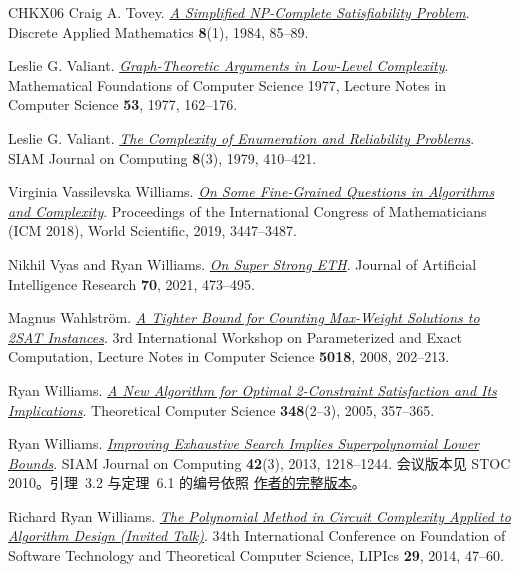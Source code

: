 \documentclass[11pt,reqno]{amsart}
\numberwithin{equation}{section}
\theoremstyle{definition}\newtheorem{definition}[theorem]{定义}
\theoremstyle{remark}\newtheorem{remark}[theorem]{注}
\begin{document}
\begin{thebibliography}{CHKX06}
Craig A. Tovey.
\href{https://doi.org/10.1016/0166-218X(84)90081-7}
{\emph{A Simplified NP-Complete Satisfiability Problem}}.
Discrete Applied Mathematics \textbf{8}(1), 1984, 85--89.

Leslie G. Valiant.
\href{https://doi.org/10.1007/3-540-08353-7_135}
{\emph{Graph-Theoretic Arguments in Low-Level Complexity}}.
Mathematical Foundations of Computer Science 1977,
Lecture Notes in Computer Science \textbf{53}, 1977, 162--176.

Leslie G. Valiant.
\href{https://doi.org/10.1137/0208032}
{\emph{The Complexity of Enumeration and Reliability Problems}}.
SIAM Journal on Computing \textbf{8}(3), 1979, 410--421.

Virginia Vassilevska Williams.
\href{https://doi.org/10.1142/9789813272880_0188}
{\emph{On Some Fine-Grained Questions in Algorithms and Complexity}}.
Proceedings of the International Congress of Mathematicians (ICM 2018),
World Scientific, 2019, 3447--3487.

Nikhil Vyas and Ryan Williams.
\href{https://doi.org/10.1613/jair.1.11859}
{\emph{On Super Strong ETH}}.
Journal of Artificial Intelligence Research \textbf{70}, 2021, 473--495.

Magnus Wahlstr\"om.
\href{https://doi.org/10.1007/978-3-540-79723-4_19}
{\emph{A Tighter Bound for Counting Max-Weight Solutions to 2SAT Instances}}.
3rd International Workshop on Parameterized and Exact Computation,
Lecture Notes in Computer Science \textbf{5018}, 2008, 202--213.

Ryan Williams.
\href{https://doi.org/10.1016/j.tcs.2005.09.023}
{\emph{A New Algorithm for Optimal 2-Constraint Satisfaction and Its Implications}}.
Theoretical Computer Science \textbf{348}(2--3), 2005, 357--365.

Ryan Williams.
\href{https://doi.org/10.1137/10080703X}
{\emph{Improving Exhaustive Search Implies Superpolynomial Lower Bounds}}.
SIAM Journal on Computing \textbf{42}(3), 2013, 1218--1244.
会议版本见 STOC 2010。引理~3.2 与定理~6.1 的编号依照
\href{https://people.csail.mit.edu/rrw/improved-algs-lbs2.pdf}{作者的完整版本}。

Richard Ryan Williams.
\href{https://doi.org/10.4230/LIPIcs.FSTTCS.2014.47}
{\emph{The Polynomial Method in Circuit Complexity Applied to Algorithm
Design (Invited Talk)}}.
34th International Conference on Foundation of Software Technology and
Theoretical Computer Science, LIPIcs \textbf{29}, 2014, 47--60.


\end{thebibliography}
\end{document}
